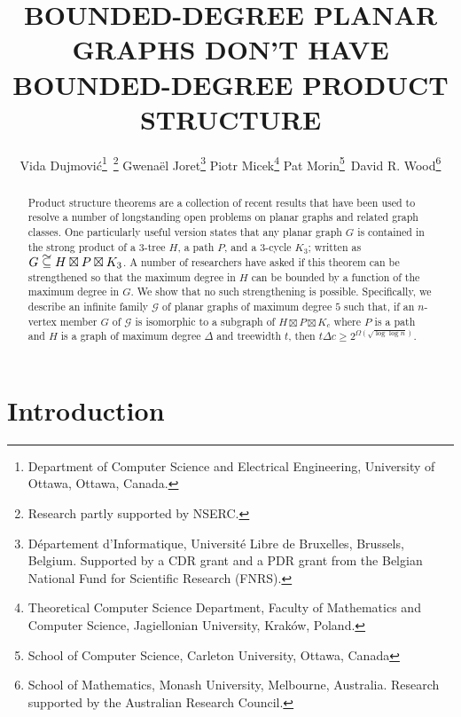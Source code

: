 \documentclass{patmorin}
\title{\MakeUppercase{Bounded-Degree Planar Graphs Don't Have Bounded-Degree Product Structure}}
\author{%
  Vida Dujmović\thanks{Department of Computer Science and Electrical Engineering, University of Ottawa, Ottawa, Canada.}\, \thanks{Research partly supported by NSERC.} \quad
  Gwenaël Joret\thanks{D\'epartement d'Informatique, Universit\'e Libre de Bruxelles, Brussels, Belgium.
  Supported by a CDR grant and a PDR grant from the Belgian National Fund for Scientific Research (FNRS).} \quad
  Piotr Micek\thanks{Theoretical Computer Science Department, Faculty of Mathematics and Computer Science, Jagiellonian University, Krak\'ow, Poland.}\quad
  Pat Morin\thanks{School of Computer Science, Carleton University, Ottawa, Canada}\, \footnotemark[2] \quad
  David R. Wood\thanks{School of Mathematics, Monash University, Melbourne, Australia.
  Research supported by the Australian Research Council.}
}
\date{}
\newcommand\subsetcong{\mathrel{\text{%
    \setbox0\hbox{$\subseteq$}%
    \rlap{\hbox to \wd0{\hss\hss\hss\raisebox{1.5\height}{$\sim$}\hss}}\box0
}}}
\renewcommand{\ge}{\geqslant}
\begin{document}
\maketitle


\begin{abstract}
   Product structure theorems are a collection of recent results that have been used to resolve a number of longstanding open problems on planar graphs and related graph classes.  One particularly useful version states that any planar graph $G$ is contained in the strong product of a $3$-tree $H$, a path $P$, and a $3$-cycle $K_3$; written as $G\subsetcong H\boxtimes P\boxtimes K_3$.  A number of researchers have asked if this theorem can be strengthened so that the maximum degree in $H$ can be bounded by a function of the maximum degree in $G$.  We show that no such strengthening is possible.  Specifically, we describe an infinite family $\mathcal{G}$ of planar graphs of maximum degree $5$ such that, if an $n$-vertex member $G$ of $\mathcal{G}$ is isomorphic to a subgraph of $H\boxtimes P\boxtimes K_c$ where $P$ is a path and $H$ is a graph of maximum degree $\Delta$ and treewidth $t$, then $t\Delta c \ge 2^{\Omega(\sqrt{\log\log n})}$.
\end{abstract}

\section{Introduction}
\end{document}
